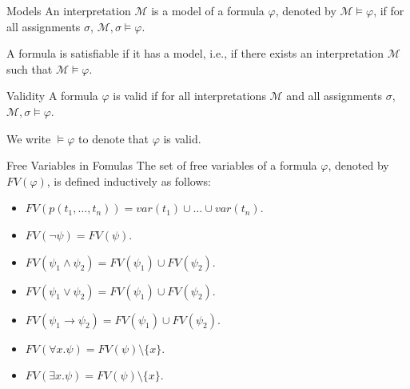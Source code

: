 \documentclass{beamer}
\begin{document}
  \begin{frame}{Models}
    An interpretation $\mathcal{M}$ is a model of a formula $\varphi$, denoted by $\mathcal{M}\models\varphi$, if for all assignments $\sigma$, $\mathcal{M}, \sigma\models\varphi$.
    
    \vspace*{0.5cm}
    A formula is satisfiable if it has a model, i.e., if there exists an interpretation $\mathcal{M}$ such that $\mathcal{M}\models\varphi$.
    
    
  \end{frame}
 

  \begin{frame}{Validity}
    A formula $\varphi$ is valid if for all interpretations $\mathcal{M}$ and all assignments $\sigma$, $\mathcal{M}, \sigma\models\varphi$.
    
    We write $\models\varphi$ to denote that $\varphi$ is valid.
  \end{frame}

  \begin{frame}{Free Variables in Fomulas}
    The set of free variables of a formula $\varphi$, denoted by $FV(\varphi)$, is defined inductively as follows:
    \begin{itemize}
    \item $FV(p(t_1, \ldots, t_n))=var(t_1)\cup\ldots\cup var(t_n)$.
    \item $FV(\neg\psi)=FV(\psi)$.
    \item $FV(\psi_1\wedge\psi_2)=FV(\psi_1)\cup FV(\psi_2)$.
    \item $FV(\psi_1\vee\psi_2)=FV(\psi_1)\cup FV(\psi_2)$.
    \item $FV(\psi_1\rightarrow\psi_2)=FV(\psi_1)\cup FV(\psi_2)$.
    \item $FV(\forall x.\psi)=FV(\psi)\setminus\{x\}$.
    \item $FV(\exists x.\psi)=FV(\psi)\setminus\{x\}$.
    \end{itemize}
  \end{frame}
\end{document}
